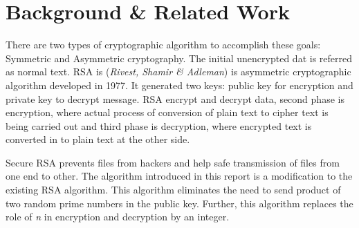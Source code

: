 \documentclass[12pt,journal,compsoc]{IEEEtran}
\begin{document}
\section{{Background \& Related Work}}
There are two types of cryptographic algorithm to accomplish these goals: Symmetric and Asymmetric cryptography. The initial unencrypted dat is referred as normal text. RSA is (\emph{Rivest, Shamir \& Adleman}) is asymmetric cryptographic algorithm developed in 1977. It generated two keys: public key for encryption and private key to decrypt message. RSA encrypt and decrypt data, second phase is encryption, where actual process of conversion of plain text to cipher text is being carried out and third phase is decryption, where encrypted text is converted in to plain text at the other side.


Secure RSA prevents files from hackers and help safe transmission of files from one end to other\cite{6021216}. The algorithm introduced in this report is a modification to the existing RSA algorithm. This algorithm eliminates the need to send product of two random prime numbers in the public key. Further, this algorithm replaces the role of \emph{n} in encryption and decryption by an integer.



\end{document}
